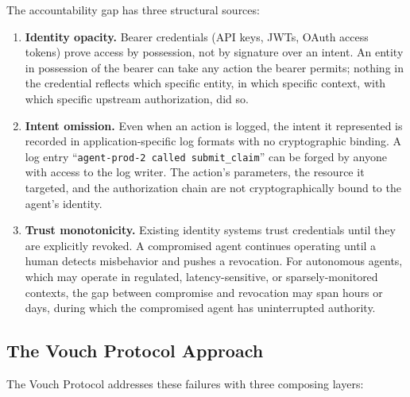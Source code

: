 \documentclass[11pt,a4paper,twocolumn]{article}
\begin{document}
The accountability gap has three structural sources:

\begin{enumerate}[label=\textbf{\arabic*.},leftmargin=*]
\item \textbf{Identity opacity.} Bearer credentials (API keys, JWTs, OAuth access tokens) prove access by possession, not by signature over an intent. An entity in possession of the bearer can take any action the bearer permits; nothing in the credential reflects which specific entity, in which specific context, with which specific upstream authorization, did so.

\item \textbf{Intent omission.} Even when an action is logged, the intent it represented is recorded in application-specific log formats with no cryptographic binding. A log entry ``\texttt{agent-prod-2 called submit\_claim}'' can be forged by anyone with access to the log writer. The action's parameters, the resource it targeted, and the authorization chain are not cryptographically bound to the agent's identity.

\item \textbf{Trust monotonicity.} Existing identity systems trust credentials until they are explicitly revoked. A compromised agent continues operating until a human detects misbehavior and pushes a revocation. For autonomous agents, which may operate in regulated, latency-sensitive, or sparsely-monitored contexts, the gap between compromise and revocation may span hours or days, during which the compromised agent has uninterrupted authority.
\end{enumerate}

\subsection{The Vouch Protocol Approach}

The Vouch Protocol addresses these failures with three composing layers:
\end{document}
